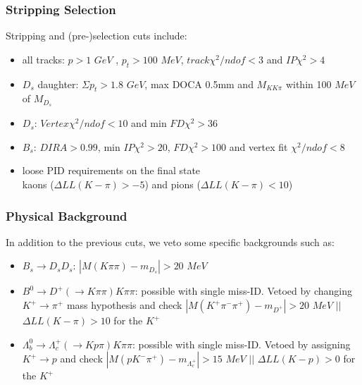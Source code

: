 \documentclass[]{beamer}
\begin{document}
\begin{frame}
\frametitle{Stripping Selection}
Stripping and (pre-)selection cuts include:

\begin{itemize}

\item all tracks: $p > 1$ $GeV$ , $p_{t} > 100$ $MeV$, $track\chi^{2}/ndof < 3$ and $IP\chi^{2} > 4$ 

\item $D_{s}$ daughter: $\Sigma p_{t} > 1.8$ $GeV$, max DOCA 0.5mm and $M_{KK\pi}$ within 100 $MeV$ of $M_{D_{s}}$  

\item $D_{s}$: $Vertex\chi^{2}/ndof < 10$ and min $FD\chi^{2} > 36$ 

\item $B_{s}$: $DIRA > 0.99$, min $IP\chi^{2} > 20$, $FD\chi^{2} > 100$ and vertex fit $\chi^{2}/ndof < 8$

\item loose PID requirements on the final state \\ kaons ($\Delta LL(K - \pi) > -5$) and pions ($\Delta LL(K - \pi) < 10$)

\end{itemize}

\end{frame}

\begin{frame}

\frametitle{Physical Background}

In addition to the previous cuts, we veto some specific backgrounds such as:

\begin{itemize}

\item $B_{s}\rightarrow D_{s}D_{s}$: \newline
 $|M(K\pi\pi) - m_{D_{s}}| > 20$ $MeV$

\item $B^{0}\rightarrow D^{+}(\rightarrow K\pi\pi)K\pi\pi$: \newline
 possible with single miss-ID. Vetoed by changing $K^{+}\rightarrow\pi^{+}$ mass hypothesis and check $|M(K^{+}\pi^{-}\pi^{+}) - m_{D^{+}}| > 20$ $MeV$ \newline
$||$ $\Delta LL(K - \pi) > 10$ for the $K^{+}$

\item $\Lambda_{b}^{0}\rightarrow \Lambda_{c}^{+}(\rightarrow Kp\pi)K\pi\pi$: \newline
 possible with single miss-ID. Vetoed by assigning $K^{+}\rightarrow p$ and check $|M(pK^{-}\pi^{+}) - m_{\Lambda_{c}^{+}}| > 15$ $MeV$ \newline
$||$ $\Delta LL(K - p) > 0$ for the $K^{+}$

\end{itemize}

\end{frame}
\end{document}
